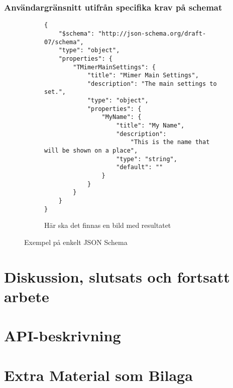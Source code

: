 \documentclass[swedish]{kththesis}
\begin{document}
\subsection{Användargränsnitt utifrån specifika krav på schemat}
\begin{figure}
	\begin{subfigure}{\textwidth}
		\centering
		\begin{verbatim}
{
	"$schema": "http://json-schema.org/draft-07/schema",
	"type": "object",
	"properties": {
		"TMimerMainSettings": {
			"title": "Mimer Main Settings",
			"description": "The main settings to set.",
			"type": "object",
			"properties": {
				"MyName": {
					"title": "My Name",
					"description":
						"This is the name that will be shown on a place",
					"type": "string",
					"default": ""
				}
			}
		}
	}
}
		\end{verbatim}
		\vspace{2em}
	\end{subfigure}
	\begin{subfigure}{\textwidth}
		\centering
		Här ska det finnas en bild med resultatet
	\end{subfigure}
	\caption{Exempel på enkelt JSON Schema}
\end{figure}

\chapter{Diskussion, slutsats och fortsatt arbete}

\printbibliography[heading=bibintoc] %

\appendix

\chapter{API-beskrivning}
\label{appendix:api-beskrivning}

\chapter{Extra Material som Bilaga}
\end{document}
